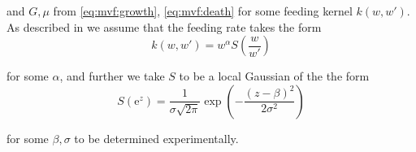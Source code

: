\documentclass[../main.tex]{subfiles}
\begin{document}
  and $G, \mu$ from \autoref{eq:mvf:growth}, \autoref{eq:mvf:death} for some feeding kernel $k(w, w')$. As described in \cite{benoit2004} we assume that the feeding rate takes the form
  \begin{equation}\label{eq:mvf:feeding}
    k(w, w') = w^{\alpha} S\left( \frac{w}{w'} \right)
  \end{equation}

  for some $\alpha$, and further we take $S$ to be a local Gaussian of the the form
  \begin{equation}\label{eq:mvf:feedgaussian}
    S\left( \mathrm{e}^z \right) = \frac{1}{\sigma \sqrt{2\pi}} \exp{\left( - \frac{(z - \beta)^2}{2 \sigma^2}\right)}
  \end{equation}

  for some $\beta, \sigma$ to be determined experimentally.
\end{document}
